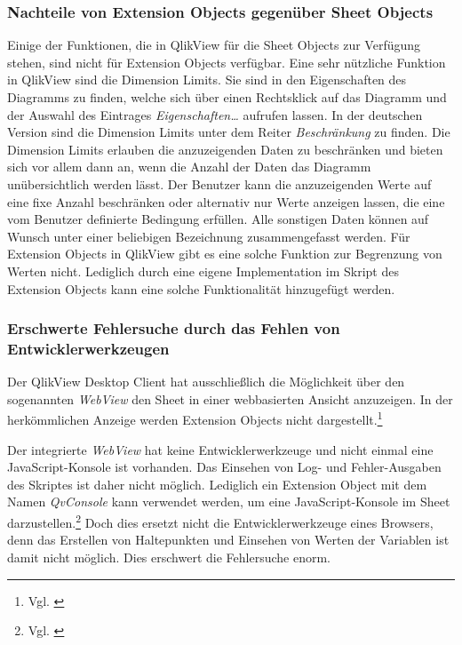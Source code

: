 \subsubsection{Nachteile von Extension Objects gegenüber Sheet Objects}
\label{lab:NachteileVonExtensionObjectsGegenüberSheetObjects} 

Einige der Funktionen, die in QlikView für die Sheet Objects zur Verfügung stehen, sind nicht für Extension Objects verfügbar.
Eine sehr nützliche Funktion in QlikView sind die Dimension Limits. Sie sind in den Eigenschaften des Diagramms zu finden, welche sich über einen Rechtsklick auf das Diagramm und der Auswahl des Eintrages \textit{Eigenschaften…} aufrufen lassen. In der deutschen Version sind die Dimension Limits unter dem Reiter \textit{Beschränkung} zu finden. Die Dimension Limits erlauben die anzuzeigenden Daten zu beschränken und bieten sich vor allem dann an, wenn die Anzahl der Daten das Diagramm unübersichtlich werden lässt. Der Benutzer kann die anzuzeigenden Werte auf eine fixe Anzahl beschränken oder alternativ nur Werte anzeigen lassen, die eine vom Benutzer definierte Bedingung erfüllen. Alle sonstigen Daten können auf Wunsch unter einer beliebigen Bezeichnung zusammengefasst werden. Für Extension Objects in QlikView gibt es eine solche Funktion zur Begrenzung von Werten nicht. Lediglich durch eine eigene Implementation im Skript des Extension Objects kann eine solche Funktionalität hinzugefügt werden. 


\subsubsection{Erschwerte Fehlersuche durch das Fehlen von Entwicklerwerkzeugen}
\label{lab:ErschwerteFehlersucheDurchFehlenVonEntwicklerwerkzeugen} 

Der QlikView Desktop Client hat ausschließlich die Möglich\-keit über den sogenannten \textit{WebView} den Sheet in einer webbasierten Ansicht anzuzeigen. In der herkömmlichen Anzeige werden Extension Objects nicht dargestellt.\footnote{Vgl. \cite[S. 164]{redmond2013qlikview}}

Der integrierte \textit{WebView} hat keine Entwickler\-werkzeuge und nicht einmal eine JavaScript-Konsole ist vorhanden. Das Einsehen von Log- und Fehler-Ausgaben des Skriptes ist daher nicht möglich. Lediglich ein Extension Object mit dem Namen \textit{QvConsole} kann verwendet werden, um eine JavaScript-Konsole im Sheet darzustellen.\footnote{Vgl. \cite{walther2013comprehensive}} Doch dies ersetzt nicht die Entwickler\-werkzeuge eines Browsers, denn das Erstellen von Haltepunkten und Einsehen von Werten der Variablen ist damit nicht möglich. Dies erschwert die Fehler\-suche enorm.

